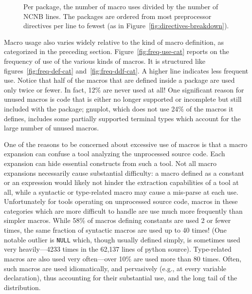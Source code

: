\documentclass[10pt]{article}
\newcommand{\pkg}[1]{\textsf{#1}}
\begin{document}
\begin{figure}
\centerline{}
\caption{Per package, the number of macro uses divided by the number of
  NCNB lines.  The packages are ordered from most preprocessor
  directives per line to fewest (as in
  Figure~\ref{fig:directives-breakdown}).}
\label{fig:use-per-line}
\end{figure}

Macro usage also varies widely relative to the kind of macro definition,
as categorized in the preceding section.  Figure~\ref{fig:freq-use-cat}
reports on the frequency of use of the various kinds of macros.  It is
structured like figures~\ref{fig:freq-def-cat}
and~\ref{fig:freq-ddf-cat}. A higher line indicates less frequent use.
Notice that half of the macros that are defined inside a package are
used only twice or fewer.  In fact, 12\% are never used at all!  One
significant reason for unused macros is code that is either no longer
supported or incomplete but still included with the package;
\pkg{gnuplot}, which does not use 24\% of the macros it defines,
includes some partially supported terminal types which account for the
large number of unused macros.

One of the reasons to be concerned about excessive use of macros is that
a macro expansion can confuse a tool analyzing the unprocessed source
code.  Each expansion can hide essential constructs from such a tool.
Not all macro expansions necessarily cause substantial difficulty: a
macro defined as a constant or an expression would likely not hinder the
extraction capabilities of a tool at all, while a syntactic or
type-related macro may cause a mis-parse at each use.  Unfortunately for
tools operating on unprocessed source code, macros in these categories which are more
difficult to handle are use much more frequently
than simpler macros.  While 58\% of macros defining constants are
used 2 or fewer times, the same fraction of syntactic macros are used up
to 40 times!  (One notable outlier is \texttt{NULL} which, though usually
defined simply, is sometimes used very heavily---4233 times in the
62,137 lines of \pkg{python} source). Type-related macros are also used
very often---over 10\% are used more than 80 times.  Often, such macros
are used idiomatically, and pervasively (e.g., at every variable
declaration), thus accounting for their substantial use, and the long
tail of the distribution.

\end{document}
